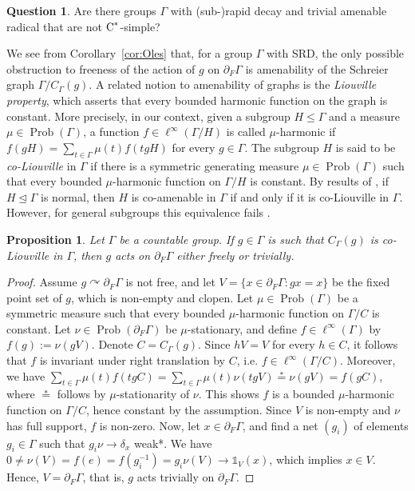 \documentclass[12pt]{amsart}
\newtheorem{prop}[theorem]{Proposition}
\theoremstyle{definition}
\newtheorem{question}{Question}
\theoremstyle{remark}
\newcommand{\pr}{\operatorname{Prob}}
\newcommand{\act}{\curvearrowright}
\newcommand{\G}{\Gamma}
\newcommand{\one}{\mathds{1}}
\begin{document}
\begin{question}\label{Q}
Are there groups $\G$ with (sub-)rapid decay and trivial amenable radical that are not $\textup{C}^*$-simple? 
\end{question}


We see from Corollary~\ref{cor:Oles} that, for a group $\Gamma$ with SRD, the only possible obstruction to freeness of the action of $g$ on $\partial_F\G$ is amenability of the Schreier graph $\G/C_\G(g)$. 
A related notion to amenability of graphs is the \emph{Liouville property}, which asserts that every bounded harmonic function on the graph is constant. More precisely, in our context, given a subgroup $H\le \G$ and a measure $\mu\in\pr(\G)$, a function $f\in \ell^\infty(\G/H)$ is called $\mu$-harmonic if $f(gH)= \sum_{t\in\G} \mu(t) f(tgH)$ for every $g\in \G$. The subgroup $H$ is said to be \emph{co-Liouville} in $\G$ if there is a symmetric generating measure $\mu\in\pr(\G)$ such that every bounded $\mu$-harmonic function on $\G/H$ is constant.
By results of \cites{Furstenberg73, KaiVer, Rosn}, if $H\trianglelefteq\G$ is normal, then $H$ is co-amenable in $\G$ if and only if it is co-Liouville in $\G$. However, for general subgroups this equivalence fails \cites{Benj, Jus23}.

\begin{prop}
Let $\G$ be a countable group. If $g\in \G$ is such that $C_\G(g)$ is co-Liouville in $\G$, then $g$ acts on $\partial_F\G$ either freely or trivially.
\end{prop}
\begin{proof}
Assume $g\act \partial_F\G$ is not free, and let $V=\{x\in \partial_F\G : gx=x\}$ be the fixed point set of $g$, which is non-empty and clopen. Let $\mu\in\pr(\G)$ be a symmetric measure such that every bounded $\mu$-harmonic function on $\G/C$ is constant. Let $\nu\in\pr(\partial_F\G)$ be $\mu$-stationary, and define $f\in\ell^\infty(\G)$ by $f(g):=\nu(gV)$.
Denote $C=C_\G(g)$. Since $hV=V$ for every $h\in C$, it follows that $f$ is invariant under right translation by $C$, i.e. $f\in \ell^\infty(\G/C)$. Moreover, we have
$\sum_{t\in\G} \mu(t) f(tgC) = \sum_{t\in\G} \mu(t) \nu(tgV)
\overset{\ast}{=} \nu(gV) = f(gC)$,
where $\overset{\ast}{=}$ follows by $\mu$-stationarity of $\nu$. This shows $f$ is a bounded $\mu$-harmonic function on $\G/C$, hence constant by the assumption. Since $V$ is non-empty and $\nu$ has full support, $f$ is non-zero. 
Now, let $x\in \partial_F\G$, and find a net $(g_i)$ of elements $g_i\in \G$ such that $g_i\nu\to \delta_{x}$ weak*. We have $0\neq \nu(V) = f(e)= f(g_i^{-1}) = g_i\nu(V) \to \one_V(x)$, which implies $x\in V$. Hence, $V=\partial_F\G$, that is, $g$ acts trivially on $\partial_F\G$.
\end{proof}
\end{document}
